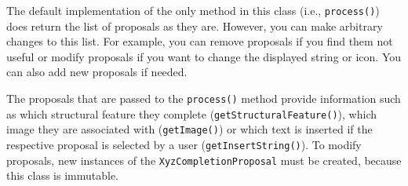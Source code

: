 The default implementation of the only method in this class (i.e.,
\texttt{process()}) does return the list of proposals as they are. However, you
can make arbitrary changes to this list. For example, you can remove proposals
if you find them not useful or modify proposals if you want to change the
displayed string or icon. You can also add new proposals if needed.

The proposals that are passed to the \texttt{process()} method provide 
information such as which structural feature they complete
(\texttt{getStructuralFeature()}), which image they are associated with
(\texttt{getImage()}) or which text is inserted if the respective proposal is
selected by a user (\texttt{getInsertString()}). To modify proposals, new
instances of the \texttt{XyzCompletionProposal} must be created, because this 
class is immutable.
